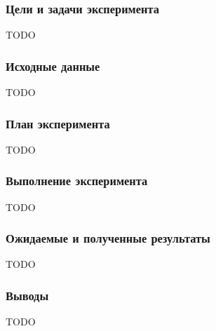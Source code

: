 \subsubsection*{Цели и задачи эксперимента}

TODO

\subsubsection*{Исходные данные}

TODO

\subsubsection*{План эксперимента}

TODO

\subsubsection*{Выполнение эксперимента}

TODO

\subsubsection*{Ожидаемые и полученные результаты}

TODO

\subsubsection*{Выводы}

TODO

\clearpage
\newpage